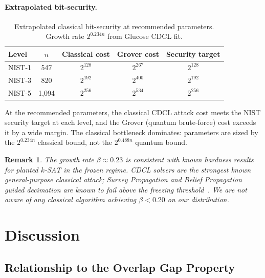 \documentclass[11pt]{article}
\newtheorem{remark}[theorem]{Remark}
\begin{document}
\paragraph{Extrapolated bit-security.}

\begin{table}[ht]
\centering
\caption{Extrapolated classical bit-security at recommended parameters.  Growth rate $2^{0.234n}$ from Glucose CDCL fit.}\label{tab:bitsec}
\begin{tabular}{@{}lcccc@{}}
\toprule
Level & $n$ & Classical cost & Grover cost & Security target \\
\midrule
NIST-1 & 547 & $2^{128}$ & $2^{267}$ & $2^{128}$ \\
NIST-3 & 820 & $2^{192}$ & $2^{400}$ & $2^{192}$ \\
NIST-5 & 1{,}094 & $2^{256}$ & $2^{534}$ & $2^{256}$ \\
\bottomrule
\end{tabular}
\end{table}

At the recommended parameters, the classical CDCL attack cost meets the NIST security target at each level, and the Grover (quantum brute-force) cost exceeds it by a wide margin.  The classical bottleneck dominates: parameters are sized by the $2^{0.234n}$ classical bound, not the $2^{0.488n}$ quantum bound.

\begin{remark}
The growth rate $\beta \approx 0.23$ is consistent with known hardness results for planted $k$-SAT in the frozen regime.  CDCL solvers are the strongest known general-purpose classical attack; Survey Propagation and Belief Propagation guided decimation are known to fail above the freezing threshold~\cite{ACO08}.  We are not aware of any classical algorithm achieving $\beta < 0.20$ on our distribution.
\end{remark}


\section{Discussion}

\subsection{Relationship to the Overlap Gap Property}
\end{document}
